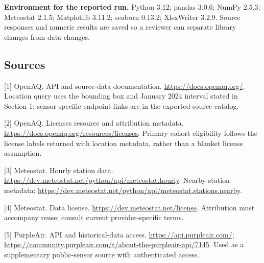 \documentclass[11pt,a4paper]{article}
\begin{document}
\textbf{Environment for the reported run.} Python 3.12; pandas 3.0.6; NumPy 2.5.3; Meteostat 2.1.5; Matplotlib 3.11.2; seaborn 0.13.2; XlsxWriter 3.2.9. Source responses and numeric results are saved so a reviewer can separate library changes from data changes.

\subsection*{Sources}
\small
[1] OpenAQ. API and source-data documentation. \url{https://docs.openaq.org/}. Location query uses the bounding box and January 2024 interval stated in Section 1; sensor-specific endpoint links are in the exported source catalog.

[2] OpenAQ. Licenses resource and attribution metadata. \url{https://docs.openaq.org/resources/licenses}. Primary cohort eligibility follows the license labels returned with location metadata, rather than a blanket license assumption.

[3] Meteostat. Hourly station data. \url{https://dev.meteostat.net/python/api/meteostat.hourly}. Nearby-station metadata: \url{https://dev.meteostat.net/python/api/meteostat.stations.nearby}.

[4] Meteostat. Data license. \url{https://dev.meteostat.net/license}. Attribution must accompany reuse; consult current provider-specific terms.

[5] PurpleAir. API and historical-data access. \url{https://api.purpleair.com/}; \url{https://community.purpleair.com/t/about-the-purpleair-api/7145}. Used as a supplementary public-sensor source with authenticated access.
\end{document}
